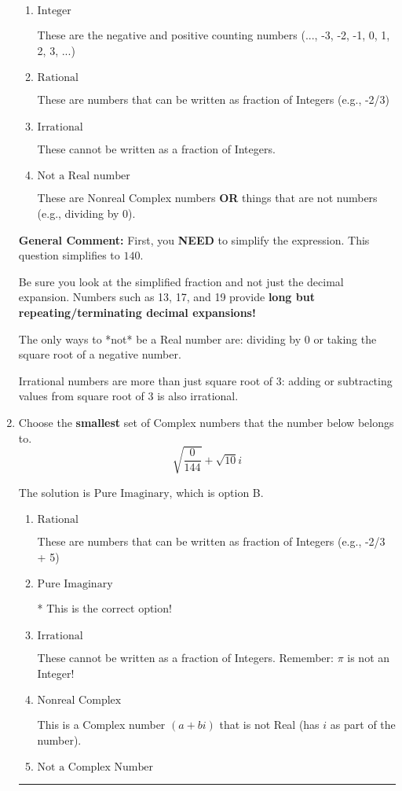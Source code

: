 \documentclass{extbook}[14pt]
\newcommand{\litem}[1]{\item #1

\rule{\textwidth}{0.4pt}}
\begin{document}
\begin{enumerate}
{\begin{enumerate}[label=\Alph*.]
* This is the correct option!
\item \( \text{Integer} \)

These are the negative and positive counting numbers (..., -3, -2, -1, 0, 1, 2, 3, ...)
\item \( \text{Rational} \)

These are numbers that can be written as fraction of Integers (e.g., -2/3)
\item \( \text{Irrational} \)

These cannot be written as a fraction of Integers.
\item \( \text{Not a Real number} \)

These are Nonreal Complex numbers \textbf{OR} things that are not numbers (e.g., dividing by 0).
\end{enumerate}

\textbf{General Comment:} First, you \textbf{NEED} to simplify the expression. This question simplifies to $140$. 
 
 Be sure you look at the simplified fraction and not just the decimal expansion. Numbers such as 13, 17, and 19 provide \textbf{long but repeating/terminating decimal expansions!} 
 
 The only ways to *not* be a Real number are: dividing by 0 or taking the square root of a negative number. 
 
 Irrational numbers are more than just square root of 3: adding or subtracting values from square root of 3 is also irrational.
}
\litem{
Choose the \textbf{smallest} set of Complex numbers that the number below belongs to.
\[ \sqrt{\frac{0}{144}}+\sqrt{10}i \]

The solution is \( \text{Pure Imaginary} \), which is option B.\begin{enumerate}[label=\Alph*.]
\item \( \text{Rational} \)

These are numbers that can be written as fraction of Integers (e.g., -2/3 + 5)
\item \( \text{Pure Imaginary} \)

* This is the correct option!
\item \( \text{Irrational} \)

These cannot be written as a fraction of Integers. Remember: $\pi$ is not an Integer!
\item \( \text{Nonreal Complex} \)

This is a Complex number $(a+bi)$ that is not Real (has $i$ as part of the number).
\item \( \text{Not a Complex Number} \)


\end{enumerate}}
\end{enumerate}
\end{document}
